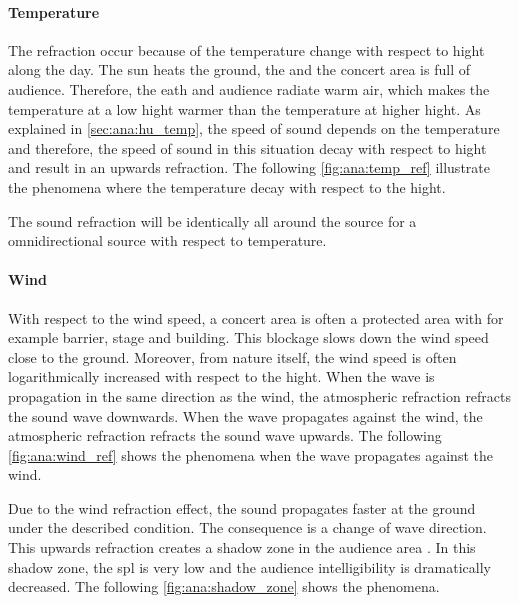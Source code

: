\paragraph{Temperature} The refraction occur because of the temperature change with respect to hight along the day. The sun heats the ground, the and the concert area is full of audience. Therefore, the eath and audience radiate warm air, which makes the temperature at a low hight warmer than the temperature at higher hight. As explained in \autoref{sec:ana:hu_temp}, the speed of sound depends on the temperature and therefore, the speed of sound in this situation decay with respect to hight and result in an upwards refraction. The following \autoref{fig:ana:temp_ref} illustrate the phenomena where the temperature decay with respect to the hight.


The sound refraction will be identically all around the source for a omnidirectional source with respect to temperature.


\paragraph{Wind} With respect to the wind speed, a concert area is often a protected area with for example barrier, stage and building. This blockage slows down the wind speed close to the ground. Moreover, from nature itself, the wind speed is often logarithmically increased with respect to the hight. When the wave is propagation in the same direction as the wind, the atmospheric refraction refracts the sound wave downwards. When the wave propagates against the wind, the atmospheric refraction refracts the sound wave upwards. The following \autoref{fig:ana:wind_ref} shows the phenomena when the wave propagates against the wind.


Due to the wind refraction effect, the sound propagates faster at the ground under the described condition. The consequence is a change of wave direction. This upwards refraction creates a shadow zone in the audience area \citep{asmos_acous_2016}. In this shadow zone, the \gls{spl} is very low and the audience intelligibility is dramatically decreased. The following \autoref{fig:ana:shadow_zone} shows the phenomena.



